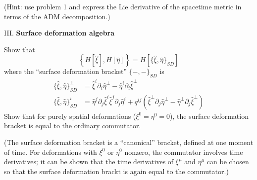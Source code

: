 (Hint: use problem 1 and express the Lie derivative of the spacetime
metric in terms of the ADM decomposition.)

\medbreak\noindent{}III. \textbf{Surface deformation algebra}\medbreak

Show that
\begin{equation*}
\left\{H[\widehat{\xi}], H[\widehat{\eta}]\right\} = H[\{\widehat{\xi},\widehat{\eta}\}_{SD}]
\end{equation*}
where the ``surface deformation bracket'' $\{-,-\}_{SD}$ is
\begin{align*}
  \{\widehat{\xi},\widehat{\eta}\}_{SD}^{\bot} &= \widehat{\xi}^{i}\partial_{i}\widehat{\eta}^{\bot}-\widehat{\eta}^{i}\partial_{i}\widehat{\xi}^{\bot}\\
  \{\widehat{\xi},\widehat{\eta}\}_{SD}^{i} &=
  \widehat{\eta}^{j}\partial_{j}\widehat{\xi}^{i}
  \widehat{\xi}^{j}\partial_{j}\widehat{\eta}^{i}
  +q^{ij}\left(\widehat{\xi}^{\bot}\partial_{j}\widehat{\eta}^{\bot} - \widehat{\eta}^{\bot}\partial_{j}\widehat{\xi}^{\bot}\right)
\end{align*}
Show that for purely spatial deformations ($\xi^{0}=\eta^{0}=0$), the
surface deformation bracket is equal to the ordinary commutator.

(The surface deformation bracket is a ``canonical'' bracket, defined at
one moment of time. For deformations with $\xi^{0}$ or $\eta^{0}$
nonzero, the commutator involves time derivatives; it can be shown that
the time derivatives of $\xi^{\mu}$ and $\eta^{\mu}$ can be chosen so
that the surface deformation brackt is again equal to the commutator.)
